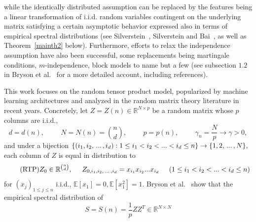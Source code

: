 \documentclass{article}
\numberwithin{equation}{section}
\begin{document}
while the %
identically distributed assumption can be replaced by the features being a linear transformation of i.i.d. random variables contingent on the underlying matrix satisfying a certain asymptotic behavior expressed also in terms of empirical spectral distributions (see Silverstein~\cite{silv1}, Silverstein and Bai~\cite{silv2}, as well as Theorem~\ref{mainth2} below). Furthermore, efforts to relax the independence assumption have also been successful, some replacements being martingale conditions, \(m\)-independence, block models to name but a few (see subsection \(1.2\) in Bryson et al.~\cite{bryson} for a more detailed account, including references). %
\par
This work focuses on the random tensor product model, popularized by machine learning architectures and analyzed in the random matrix theory literature in recent years. Concretely, let \(Z=Z(n) \in \mathbb{R}^{N \times p}\) be a random matrix whose \(p\) columns are i.i.d., 
\begin{equation}\tag{RMT}\label{modelz}
    d=d(n),\hspace{1cm} N=N(n)=\binom{n}{d}, \hspace{1cm} p=p(n), \hspace{1cm} \gamma_n=\frac{N}{p} \to \gamma>0,
\end{equation}
and under a bijection \(\{(i_1,i_2,\hspace{0.05cm}...\hspace{0.05cm},i_d): 1 \leq i_1<i_2<...<i_d \leq n\} \to \{1,2,\hspace{0.05cm}...\hspace{0.05cm},N\},\) each column of \(Z\) is equal in distribution to %
\begin{equation}\tag{RTP}\label{zmoddel}
    Z_0 \in \mathbb{R}^{\binom{n}{d}}, \hspace{0.5cm} Z_{0,i_1,i_2,\hspace{0.05cm}...\hspace{0.05cm},i_d}=x_{i_1}x_{i_2}...x_{i_d} \hspace{0.5cm} (1 \leq i_1<i_2<...<i_d \leq n)
\end{equation} 
for \((x_{j})_{1 \leq j \leq n}\) i.i.d., \(\mathbb{E}[x_{1}]=0,\mathbb{E}[x_{1}^2]=1.\) Bryson et al.~\cite{bryson} show that the empirical spectral distribution of 
\[S=S(n)=\frac{1}{p}ZZ^T \in \mathbb{R}^{N \times N}\] 
\end{document}
